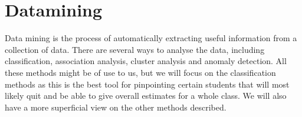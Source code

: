 \section{Datamining}
Data mining is the process of automatically extracting useful information from a collection of data. There are several ways to analyse the data, including classification, association analysis, cluster analysis and anomaly detection. All these methods might be of use to us, but we will focus on the classification methods as this is the best tool for pinpointing certain students that will most likely quit and be able to give overall estimates for a whole class. We will also have a more superficial view on the other methods described.
